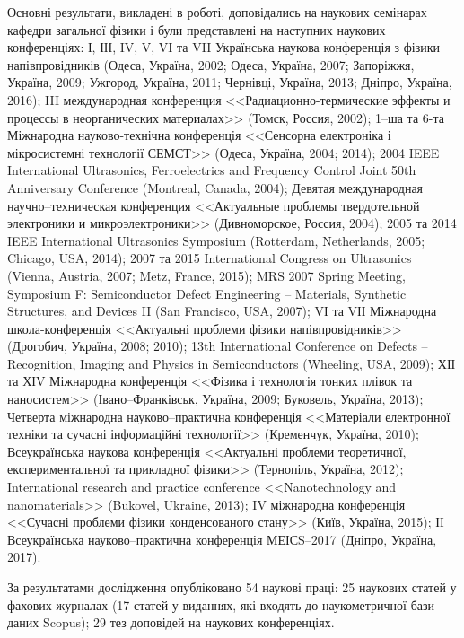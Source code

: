 {\probationTXT}
Основні результати, викладені в роботі, доповідались на наукових семінарах
кафедри загальної фізики \thesisOfOrganization
і були представлені на наступних наукових конференціях:
І, ІІІ, IV, V, VI та VII Українська наукова конференція з фізики напівпровідників
(Одеса, Україна, 2002; Одеса, Україна, 2007; Запоріжжя, Україна, 2009;
Ужгород, Україна, 2011; Чернівці, Україна, 2013; Дніпро, Україна, 2016);
III международная конференция <<Радиационно-термические эффекты и процессы в неорганических материалах>> (Томск, Россия, 2002);
1--ша та 6-та Міжнародна науково-технічна конференція <<Сенсорна електроніка і мікросистемні технології СЕМСТ>> (Одеса, Україна, 2004; 2014);
2004 IEEE International Ultrasonics, Ferroelectrics and Frequency Control Joint 50th Anniversary Conference (Montreal, Canada, 2004);
Девятая международная научно--техническая конференция <<Актуальные проблемы твердотельной электроники и микроэлектроники>> (Дивноморское, Россия, 2004);
2005 та 2014 IEEE International Ultrasonics Symposium (Rotterdam, Netherlands, 2005; Chicago, USA, 2014);
2007 та 2015 International Congress on Ultrasonics (Vienna, Austria, 2007; Metz, France, 2015);
MRS 2007 Spring Meeting, Symposium F: Semiconductor Defect Engineering -- Materials, Synthetic Structures, and Devices II (San Francisco, USA, 2007);
VІ та VІІ Міжнародна школа-конференція <<Актуальні проблеми фізики напівпровідників>> (Дрогобич, Україна, 2008; 2010);
13th International Conference on Defects – Recognition, Imaging and Physics in Semiconductors (Wheeling, USA, 2009);
ХІІ та ХІV Міжнародна конференція <<Фізика і технологія тонких плівок та наносистем>> (Івано--Франківськ, Україна, 2009; Буковель, Україна, 2013);
Четверта міжнародна науково--практична конференція <<Матеріали електронної техніки та сучасні інформаційні технології>> (Кременчук, Україна, 2010);
Всеукраїнська наукова конференція <<Актуальні проблеми теоретичної, експериментальної та прикладної фізики>> (Тернопіль, Україна, 2012);
International research and practice conference <<Nanotechnology and nanomaterials>> (Bukovel, Ukraine, 2013);
IV міжнародна конференція <<Сучасні проблеми фізики конденсованого стану>> (Київ, Україна, 2015);
ІІ Всеукраїнська науково--практична конференція МЕІСS--2017 (Дніпро, Україна, 2017).

{\publicationsTXT}
За результатами дослідження опубліковано 54 наукові праці:
 25 наукових статей
 у фахових журналах (17 статей у виданнях, які входять до наукометричної бази даних Scopus); 29 тез доповідей на наукових конференціях.



